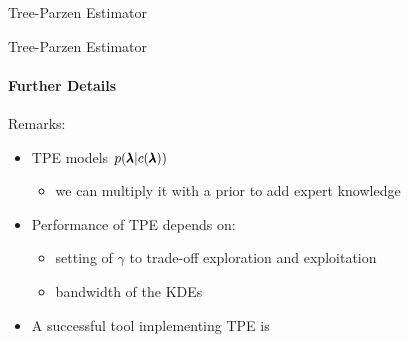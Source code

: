 \begin{frame}[c]{Tree-Parzen Estimator}
\begin{figure}
\end{figure}
\centering

\end{frame}
\begin{frame}[c]{Tree-Parzen Estimator}
\framesubtitle{Further Details}

Remarks:

\begin{itemize}
	\item TPE models $p(\pmb{\lambda} | c({\pmb{\lambda}}))$
	\begin{itemize}
		\item we can multiply it with a prior to add expert knowledge
	\end{itemize}
	\smallskip
	
	\pause
	
	\item Performance of TPE depends on:
	\begin{itemize}
		\item setting of $\gamma$ to trade-off exploration and exploitation
		\item bandwidth of the KDEs 
	\end{itemize}
	
	\pause
	
	\smallskip
	
	\smallskip
	\item A successful tool implementing TPE is 
\end{itemize}

\end{frame}
